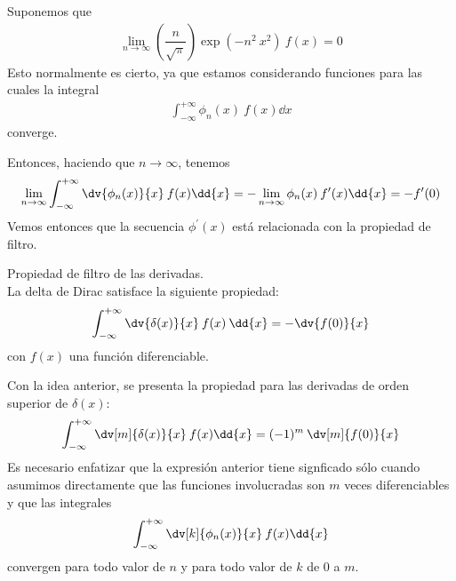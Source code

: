 Suponemos que
\begin{align*}
\lim_{n \to \infty} \left( \dfrac{n}{\sqrt{\pi}} \right) \exp(-n^{2} \: x^{2}) \: f(x) = 0
\end{align*}
Esto normalmente es cierto, ya que estamos considerando funciones para las cuales la integral
\begin{align*}
\int_{-\infty}^{+\infty} \phi_{n}(x) \: f(x) \dd{x} 
\end{align*}
converge.
\par
Entonces, haciendo que $n \to \infty$, tenemos
\begin{align*}
\lim_{n \to \infty} \int_{-\infty}^{+\infty} \dv{\phi_{n}(x)}{x} \: f(x) \dd{x} = - \lim_{n \to \infty} \phi_{n}(x) \: f^{\prime} (x) \dd{x} =  -f^{\prime}(0)
\end{align*}
Vemos entonces que la secuencia $\phi^{\prime}(x)$ está relacionada con la propiedad de filtro.
\begin{propiedad}
Propiedad de filtro de las derivadas.
\\
La delta de Dirac satisface la siguiente propiedad:
\[ \int_{-\infty}^{+\infty} \dv{\delta(x)}{x} \: f(x) \: \dd{x} = - \dv{f(0)}{x} \]
con $f(x)$ una función diferenciable.
\par
Con la idea anterior, se presenta la propiedad para las derivadas de orden superior de $\delta (x)$:
\begin{align*}
\int_{-\infty}^{+\infty} \dv[m]{\delta (x)}{x} \: f(x) \dd{x} =  (-1)^{m} \: \dv[m]{f(0)}{x}
\end{align*}
Es necesario enfatizar que la expresión anterior tiene signficado sólo cuando asumimos directamente que las funciones involucradas son $m$ veces diferenciables y que las integrales
\begin{align*}
\int_{-\infty}^{+\infty} \dv[k]{\phi_{n}(x)}{x} \: f(x) \dd{x}
\end{align*}
convergen para todo valor de $n$ y para todo valor de $k$ de $0$ a $m$.
\end{propiedad}

